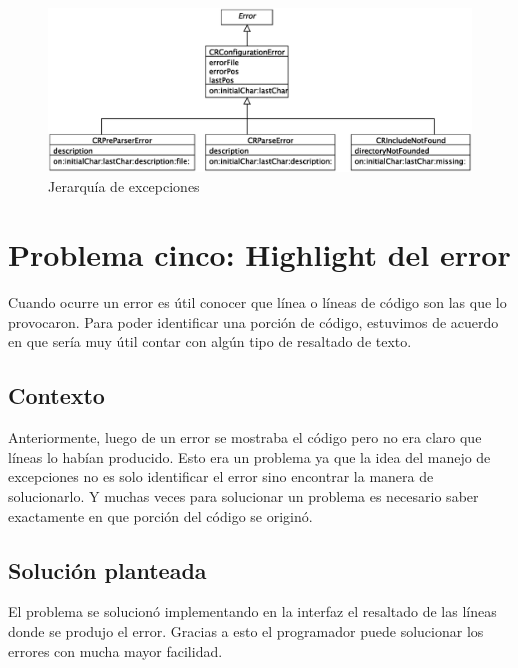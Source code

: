 \documentclass[a4paper,oneside,12pt]{article}
\begin{document}
\begin{figure}[h!]
  \centering
    \includegraphics[scale=0.5]{images/diagrama_clases_excepciones.eps}
    \caption{Jerarqu\'ia de excepciones}
    \label{diagrama_clases_excepciones}
\end{figure}

\section{Problema cinco: Highlight del error}

Cuando ocurre un error es \'util conocer que l\'inea o l\'ineas de c\'odigo son las que lo provocaron. Para poder identificar una porci\'on de c\'odigo, estuvimos de acuerdo en que ser\'ia muy \'util contar con alg\'un tipo de resaltado de texto.

\subsection{Contexto}
Anteriormente, luego de un error se mostraba el c\'odigo pero no era claro que l\'ineas lo hab\'ian producido. Esto era un problema ya que la idea del manejo de excepciones no es solo identificar el error sino encontrar la manera de solucionarlo. Y muchas veces para solucionar un problema es necesario saber exactamente en que porci\'on del c\'odigo se origin\'o.

\subsection{Soluci\'on planteada}
El problema se solucion\'o implementando en la interfaz el resaltado de las l\'ineas donde se produjo el error. Gracias a esto el programador puede solucionar los errores con mucha mayor facilidad.
\end{document}
